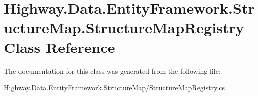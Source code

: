 \hypertarget{class_highway_1_1_data_1_1_entity_framework_1_1_structure_map_1_1_structure_map_registry}{\section{Highway.\-Data.\-Entity\-Framework.\-Structure\-Map.\-Structure\-Map\-Registry Class Reference}
\label{class_highway_1_1_data_1_1_entity_framework_1_1_structure_map_1_1_structure_map_registry}
}


The documentation for this class was generated from the following file\-:\begin{DoxyCompactItemize}
\item 
Highway.\-Data.\-Entity\-Framework.\-Structure\-Map/Structure\-Map\-Registry.\-cs\end{DoxyCompactItemize}
